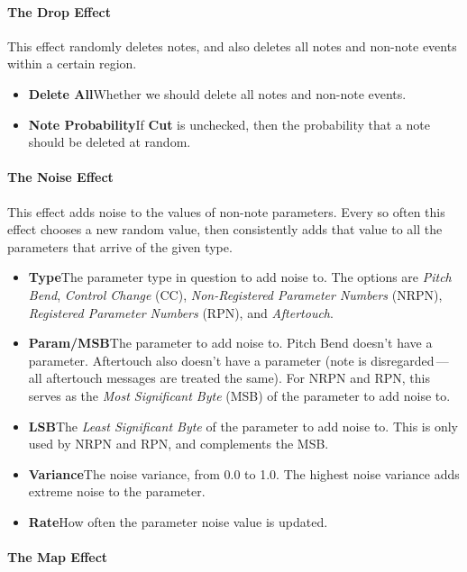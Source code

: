 \documentclass[twoside,10pt]{article}
\begin{document}
\paragraph{The Drop Effect}

This effect randomly deletes notes, and also deletes all notes and non-note events within a certain region.

\begin{itemize}
\item {\bf Delete All}\qquad Whether we should delete all notes and non-note events.
\item {\bf Note Probability}\qquad If {\bf Cut} is unchecked, then the probability that a note should be deleted at random.
\end{itemize}

\paragraph{The Noise Effect}

This effect adds noise to the values of non-note parameters.  Every so often this effect chooses a new random value, then consistently adds that value to all the parameters that arrive of the given type.

\begin{itemize}
\item {\bf Type}\qquad The parameter type in question to add noise to.  The options are {\it Pitch Bend}, {\it Control Change} (CC), {\it Non-Registered Parameter Numbers} (NRPN), {\it Registered Parameter Numbers} (RPN), and {\it Aftertouch}.
\item {\bf Param/MSB}\qquad The parameter to add noise to.  Pitch Bend doesn't have a parameter.  Aftertouch also doesn't have a parameter (note is disregarded\,---\,all aftertouch messages are treated the same).
  For NRPN and RPN, this serves as the {\it Most Significant Byte} (MSB) of the parameter to add noise to.
\item {\bf LSB}\qquad The {\it Least Significant Byte} of the parameter to add noise to.  This is only used by NRPN and RPN, and complements the MSB.
\item {\bf Variance}\qquad The noise variance, from 0.0 to 1.0.  The highest noise variance adds extreme noise to the parameter.
\item {\bf Rate}\qquad How often the parameter noise value is updated.
\end{itemize}

\paragraph{The Map Effect}
\end{document}
